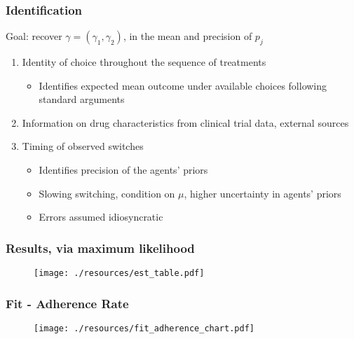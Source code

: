 
\begin{frame}
\frametitle{Identification}

Goal: recover $\gamma=(\gamma_{1},\gamma_{2})$, in the mean and precision of 
$p_{j}$

\begin{enumerate}
\item Identity of choice throughout the sequence of treatments

\begin{itemize}
\item Identifies expected mean outcome under available choices following
standard arguments
\end{itemize}

\item Information on drug characteristics from clinical trial data, external
sources

\item Timing of observed switches

\begin{itemize}
\item Identifies precision of the agents' priors

\item Slowing switching, condition on $\mu$, higher uncertainty in agents'
priors

\item Errors assumed idiosyncratic
\end{itemize}
\end{enumerate}
\end{frame}


\begin{frame}
\frametitle{Results, via maximum likelihood}

\begin{figure}[h!]
\centering\texttt{[image: ./resources/est\_table.pdf]}
\end{figure}

\hyperlink{ESTIMATION}{}
\end{frame}


\begin{frame}
\frametitle{Fit - Adherence Rate}

\begin{figure}[h!]
\centering\texttt{[image: ./resources/fit\_adherence\_chart.pdf]}
\end{figure}
\end{frame}

